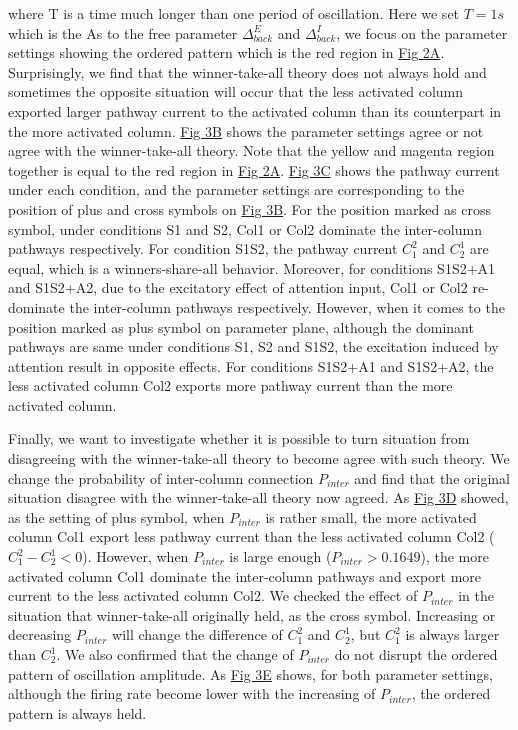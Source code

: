\documentclass[10pt,letterpaper]{article}
\begin{document}
where T is a time much longer than one period of oscillation. Here we set $T=1s$ which is the As to the free parameter $\Delta_{back}^{E}$ and $\Delta_{back}^{I}$, we focus on the parameter settings showing the ordered pattern which is the red region in \hyperlink{fig:fig2}{Fig 2A}. Surprisingly, we find that the winner-take-all theory does not always hold and sometimes the opposite situation will occur that the less activated column exported larger pathway current to the activated column than its counterpart in the more activated column. \hyperlink{fig:fig3}{Fig 3B} shows the parameter settings agree or not agree with the winner-take-all theory. Note that the yellow and magenta region together is equal to the red region in \hyperlink{fig:fig2}{Fig 2A}. \hyperlink{fig:fig3}{Fig 3C} shows the pathway current under each condition, and the parameter settings are corresponding to the position of plus and cross symbols on \hyperlink{fig:fig3}{Fig 3B}. For the position marked as cross symbol, under conditions S1 and S2, Col1 or Col2 dominate the inter-column pathways respectively. For condition S1S2, the pathway current $C_{1}^{2}$ and $C_{2}^{1}$ are equal, which is a winners-share-all behavior. Moreover, for conditions S1S2+A1 and S1S2+A2, due to the excitatory effect of attention input, Col1 or Col2 re-dominate the inter-column pathways respectively. However, when it comes to the position marked as plus symbol on parameter plane, although the dominant pathways are same under conditions S1, S2 and S1S2, the excitation induced by attention result in opposite effects. For conditions S1S2+A1 and S1S2+A2, the less activated column Col2 exports more pathway current than the more activated column.

Finally, we want to investigate whether it is possible to turn situation from disagreeing with the winner-take-all theory to become agree with such theory. We change the probability of inter-column connection $P_{inter}$ and find that the original situation disagree with the winner-take-all theory now agreed. As \hyperlink{fig:fig3}{Fig 3D} showed, as the setting of plus symbol, when $P_{inter}$ is rather small, the more activated column Col1 export less pathway current than the less activated column Col2 ($C_{1}^{2} - C_{2}^{1} < 0$). However, when $P_{inter}$ is large enough ($P_{inter}>0.1649$), the more activated column Col1 dominate the inter-column pathways and export more current to the less activated column Col2. We checked the effect of $P_{inter}$ in the situation that winner-take-all originally held, as the cross symbol. Increasing or decreasing $P_{inter}$ will change the difference of $C_{1}^{2}$ and $C_{2}^{1}$, but $C_{1}^{2}$ is always larger than $C_{2}^{1}$. We also confirmed that the change of $P_{inter}$ do not disrupt the ordered pattern of oscillation amplitude. As \hyperlink{fig:fig3}{Fig 3E} shows, for both parameter settings, although the firing rate become lower with the increasing of $P_{inter}$, the ordered pattern is always held.
\end{document}
